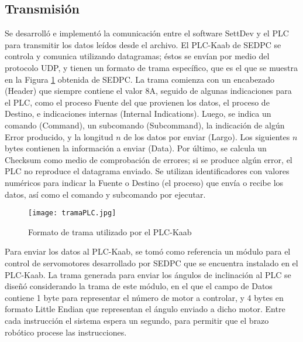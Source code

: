 \subsection{Transmisión}

Se desarrolló e implementó la comunicación entre el software SettDev y el PLC para transmitir los datos leídos desde el archivo. El PLC-Kaab de SEDPC se controla y comunica utilizando datagramas; éstos se envían por medio del protocolo UDP, y tienen un formato de trama específico, que es el que se muestra en la Figura \ref{fig:tramaPLC} obtenida de SEDPC. La trama comienza con un encabezado (Header) que siempre contiene el valor 8A, seguido de algunas indicaciones para el PLC, como el proceso Fuente del que provienen los datos, el proceso de Destino, e indicaciones internas (Internal Indications). Luego, se indica un comando (Command), un subcomando (Subcommand), la indicación de algún Error producido, y la longitud $n$ de los datos por enviar (Largo). Los siguientes $n$ bytes contienen la información a enviar (Data). Por último, se calcula un Checksum como medio de comprobación de errores; si se produce algún error, el PLC no reproduce el datagrama enviado. Se utilizan identificadores con valores numéricos para indicar la Fuente o Destino (el proceso) que envía o recibe los datos, así como el comando y subcomando por ejecutar.

\begin{figure}[htb]
	\centering
	\texttt{[image: tramaPLC.jpg]}
	\caption{Formato de trama utilizado por el PLC-Kaab}
	\label{fig:tramaPLC}
\end{figure}

Para enviar los datos al PLC-Kaab, se tomó como referencia  un módulo para el control de servomotores desarrollado por SEDPC que se encuentra instalado en el PLC-Kaab. La trama generada para enviar los ángulos de inclinación al PLC se diseñó considerando la trama de este módulo, en el que el campo de Datos contiene 1 byte para representar el número de motor a controlar, y 4 bytes en formato Little Endian que representan el ángulo enviado a dicho motor. Entre cada instrucción el sistema espera un segundo, para permitir que el brazo robótico procese las instrucciones.